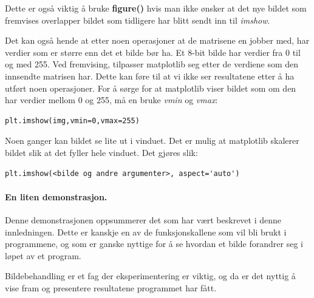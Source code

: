 \documentclass[%
oneside,                 %
final,                   %
10pt,norsk]{article}
\begin{document}
Dette er også viktig å bruke \textbf{figure()} hvis man ikke ønsker at det nye bildet som fremvises overlapper bildet som tidligere har blitt sendt inn til \emph{imshow}.



\vspace{3mm}


Det kan også hende at etter noen operasjoner at de matrisene en jobber med, har verdier som er større enn det et bilde bør ha. Et 8-bit bilde har verdier fra 0 til og med 255.
Ved fremvising, tilpasser matplotlib seg etter de verdiene som den innsendte matrisen har. Dette kan føre til at vi ikke ser resultatene etter å ha utført noen operasjoner.
For å sørge for at matplotlib viser bildet som om den har verdier mellom 0 og 255, må en bruke \emph{vmin} og \emph{vmax}:
\begin{verbatim}
plt.imshow(img,vmin=0,vmax=255)
\end{verbatim}



\vspace{3mm}


Noen ganger kan bildet se lite ut i vinduet. Det er mulig at matplotlib skalerer bildet slik at det fyller hele vinduet. Det gjøres slik:
\begin{verbatim}
plt.imshow(<bilde og andre argumenter>, aspect='auto')
\end{verbatim}
\paragraph{En liten demonstrasjon.}
\label{subsec:demo}
Denne demonstrasjonen oppsummerer det som har vært beskrevet i denne innledningen. Dette er kanskje en av de funksjonskallene som vil bli brukt i programmene, og som er ganske nyttige
for å se hvordan et bilde forandrer seg i løpet av et program.

Bildebehandling er et fag der eksperimentering er viktig, og da er det nyttig å vise fram og presentere resultatene programmet har fått.
\end{document}

